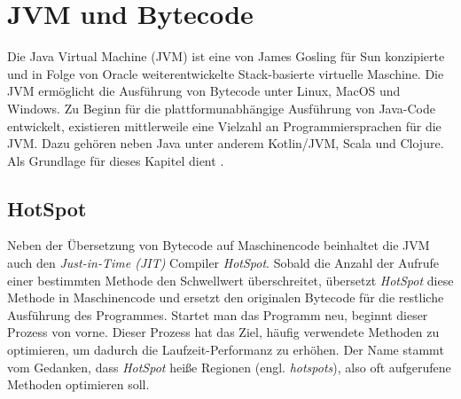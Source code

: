 \chapter{JVM und Bytecode}
\label{cha:jvm}

Die Java Virtual Machine (JVM) ist eine von James Gosling für Sun konzipierte und in Folge von Oracle weiterentwickelte Stack-basierte virtuelle Maschine. Die JVM ermöglicht die Ausführung von Bytecode unter Linux, MacOS und Windows. Zu Beginn für die plattformunabhängige Ausführung von Java-Code entwickelt, existieren mittlerweile eine Vielzahl an Programmiersprachen für die JVM. Dazu gehören neben Java unter anderem Kotlin/JVM, Scala und Clojure. Als Grundlage für dieses Kapitel dient \textcite{lindholm2016java}.

\section{HotSpot}

Neben der Übersetzung von Bytecode auf Maschinencode beinhaltet die JVM auch den \textit{Just-in-Time (JIT)} Compiler \textit{HotSpot}. Sobald die Anzahl der Aufrufe einer bestimmten Methode den Schwellwert überschreitet, übersetzt \textit{HotSpot} diese Methode in Maschinencode und ersetzt den originalen Bytecode für die restliche Ausführung des Programmes. Startet man das Programm neu, beginnt dieser Prozess von vorne. Dieser Prozess hat das Ziel, häufig verwendete Methoden zu optimieren, um dadurch die Laufzeit-Performanz zu erhöhen. Der Name stammt vom Gedanken, dass \textit{HotSpot} heiße Regionen (engl. \textit{hotspots}), also oft aufgerufene Methoden optimieren soll.

